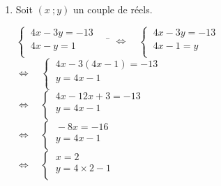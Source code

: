 \documentclass[a4paper,11pt,exos]{nsi} %
\begin{document}
\begin{enumerate}
        \item Soit $(x\ ;y)$ un couple de réels.
        \begin{tabbing}
            $\left\{
                \begin{array}{l}
                    \ 4x-3y=-13 \\
                    \ 4x-y=1\\
                \end{array} \right. \quad$  \= $\iff\quad 
                \left\{
                    \begin{array}{l}
                    \ 4x-3y=-13 \\
                    \ 4x-1=y\\
                \end{array} \right.$\\[.5em]
    
                \>  $\iff\quad \left\{
                    \begin{array}{l}
                    \ 4x-3(4x-1)=-13 \\
                    \ y=4x-1\\
                \end{array} \right.$\\[.5em]

                \>  $\iff\quad \left\{
                    \begin{array}{l}
                    \ 4x-12x+3=-13 \\
                    \ y=4x-1\\
                \end{array} \right.$\\[.5em]

                \>  $\iff\quad \left\{
                    \begin{array}{l}
                    \ -8x=-16 \\
                    \ y=4x-1\\
                \end{array} \right.$\\[.5em]

                \>  $\iff\quad \left\{
                    \begin{array}{l}
                    \ x=2 \\
                    \ y=4\times 2-1\\
                \end{array} \right.$\\[.5em]


\end{tabbing}
\end{enumerate}
\end{document}
